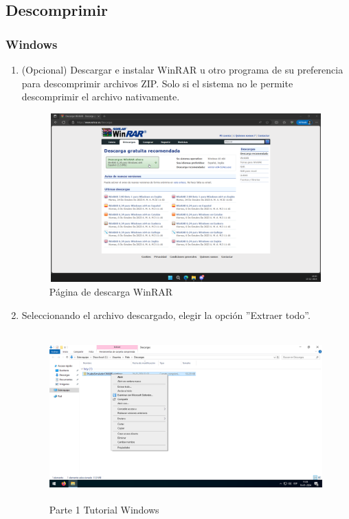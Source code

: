 \subsection*{Descomprimir}

\subsubsection*{Windows}

\begin{enumerate}[label=\arabic*.-]
    \item (Opcional) Descargar e instalar WinRAR u otro programa de su preferencia para descomprimir archivos ZIP. Solo si el sistema no le permite descomprimir el archivo nativamente.
    \begin{figure}[ht]
        \centering
        \includegraphics[width=10.5cm, height=6.5cm]{figures/TutorialWindows/winrar.png}
        \caption{Página de descarga WinRAR}
        \label{fig:winrar}
    \end{figure}

    \item Seleccionando el archivo descargado, elegir la opción ''Extraer todo''.
\begin{figure}[ht]
    \centering
    \includegraphics[width=10.5cm, height=6.5cm]{figures/TutorialWindows/tutorial (6).png}
    \caption{Parte 1 Tutorial Windows}
    \label{fig:tutowin1}
\end{figure}
\clearpage


\end{enumerate}
